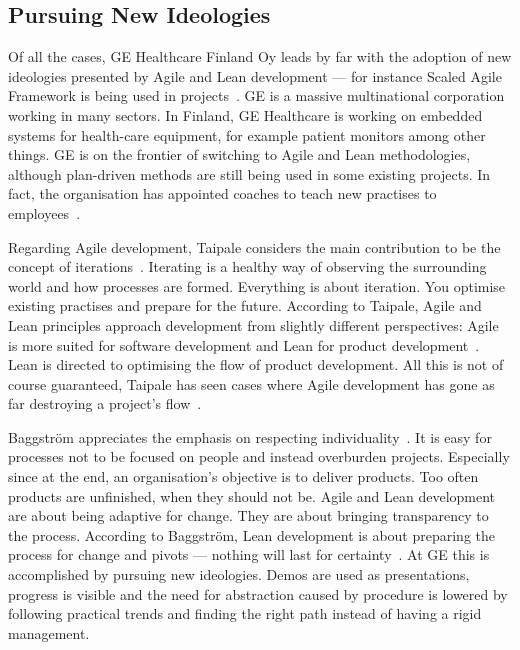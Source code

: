 \documentclass[english]{tktltiki2}
\begin{document}
\subsection{Pursuing New Ideologies}

Of all the cases, GE Healthcare Finland Oy leads by far with the adoption of new ideologies presented by Agile and Lean development — for instance Scaled Agile Framework is being used in projects~\cite{ScaledAgile, BT15}. GE is a massive multinational corporation working in many sectors. In Finland, GE Healthcare is working on embedded systems for health-care equipment, for example patient monitors among other things. GE is on the frontier of switching to Agile and Lean methodologies, although plan-driven methods are still being used in some existing projects. In fact, the organisation has appointed coaches to teach new practises to employees~\cite{BT15}.

Regarding Agile development, Taipale considers the main contribution to be the concept of iterations~\cite{BT15}. Iterating is a healthy way of observing the surrounding world and how processes are formed. Everything is about iteration. You optimise existing practises and prepare for the future. According to Taipale, Agile and Lean principles approach development from slightly different perspectives: Agile is more suited for software development and Lean for product development~\cite{BT15}. Lean is directed to optimising the flow of product development. All this is not of course guaranteed, Taipale has seen cases where Agile development has gone as far destroying a project’s flow~\cite{BT15}.

Baggström appreciates the emphasis on respecting individuality~\cite{BT15}. It is easy for processes not to be focused on people and instead overburden projects. Especially since at the end, an organisation’s objective is to deliver products. Too often products are unfinished, when they should not be. Agile and Lean development are about being adaptive for change. They are about bringing transparency to the process. According to Baggström, Lean development is about preparing the process for change and pivots — nothing will last for certainty~\cite{BT15}. At GE this is accomplished by pursuing new ideologies. Demos are used as presentations, progress is visible and the need for abstraction caused by procedure is lowered by following practical trends and finding the right path instead of having a rigid management.
\end{document}
